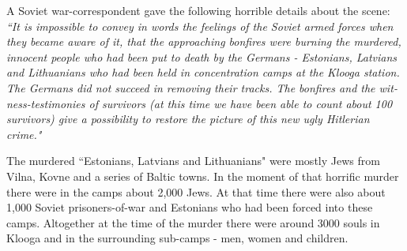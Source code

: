 \documentclass{article}
\begin{document}
\begin{pairs}
\begin{Leftside}
\begin{english}
A Soviet war-correspondent gave the following horrible details about the scene:
\emph{``It is impossible to convey in words the feelings of the Soviet armed forces when they
became aware of it, that the approaching bonfires were burning the murdered, innocent people who
had been put to death by the Germans - Estonians, Latvians and Lithuanians who had been held in
concentration camps at the Klooga station. The Germans did not succeed in removing their tracks.
The bonfires and the witness-testimonies of survivors 
(at this time we have been able to count about 100 survivors) give a possibility to restore the picture
of this new ugly Hitlerian crime."}

The murdered ``Estonians, Latvians and Lithuanians" were mostly Jews from Vilna, Kovne and a series
of Baltic towns. In the moment of that horrific murder there were in the camps about 2,000 Jews.
At that time there were also about 1,000 Soviet prisoners-of-war and Estonians who had been forced
into these camps. Altogether at the time of the murder there were around 3000 souls in Klooga and in the 
surrounding sub-camps - men, women and children.

\endnumbering
\end{english}
\end{Leftside}

\end{pairs}
\Columns
\end{document}

